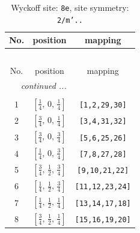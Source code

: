 \documentclass[fleqn,8pt]{jsarticle}
\begin{document}
\begin{longtable}{ccc}
\caption{Wyckoff site: {\tt 8e}, site symmetry: {\tt 2/m'..}}
 \\
 \hline \hline
No. & position & mapping \\ \hline \endfirsthead

\multicolumn{2}{l}{\tablename\ \thetable{}} \\
 \hline \hline
No. & position & mapping \\ \hline \endhead

 \hline \hline
\multicolumn{2}{r}{\footnotesize\it continued ...} \\ \endfoot

 \hline \hline
\multicolumn{2}{r}{} \\ \endlastfoot

1 & $\left[ \frac{1}{4},\, 0,\, \frac{1}{4} \right]$ & {\tt [1,2,29,30]} \\ \hline
2 & $\left[ \frac{3}{4},\, 0,\, \frac{1}{4} \right]$ & {\tt [3,4,31,32]} \\ \hline
3 & $\left[ \frac{3}{4},\, 0,\, \frac{3}{4} \right]$ & {\tt [5,6,25,26]} \\ \hline
4 & $\left[ \frac{1}{4},\, 0,\, \frac{3}{4} \right]$ & {\tt [7,8,27,28]} \\ \hline
5 & $\left[ \frac{3}{4},\, \frac{1}{2},\, \frac{3}{4} \right]$ & {\tt [9,10,21,22]} \\ \hline
6 & $\left[ \frac{1}{4},\, \frac{1}{2},\, \frac{3}{4} \right]$ & {\tt [11,12,23,24]} \\ \hline
7 & $\left[ \frac{1}{4},\, \frac{1}{2},\, \frac{1}{4} \right]$ & {\tt [13,14,17,18]} \\ \hline
8 & $\left[ \frac{3}{4},\, \frac{1}{2},\, \frac{1}{4} \right]$ & {\tt [15,16,19,20]} \\
\end{longtable}
\renewcommand{\arraystretch}{1.2}
\end{document}
